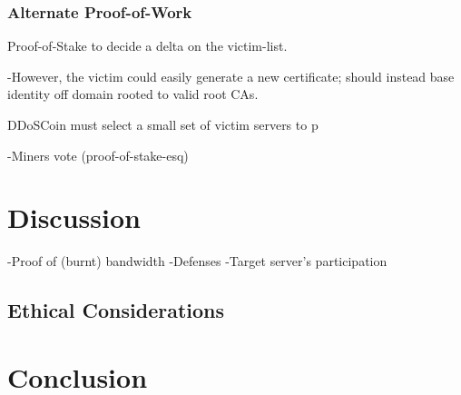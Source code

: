 \subsubsection{Alternate Proof-of-Work}


Proof-of-Stake to decide a delta on the victim-list.

-However, the victim could easily generate a new certificate; should instead
base identity off domain rooted to valid root CAs.


DDoSCoin must select a small set of victim servers to p


-Miners vote (proof-of-stake-esq)




\section{Discussion}

-Proof of (burnt) bandwidth
-Defenses
-Target server's participation

\subsection{Ethical Considerations}
\shrug


\section{Conclusion}



{\footnotesize\balance

}


